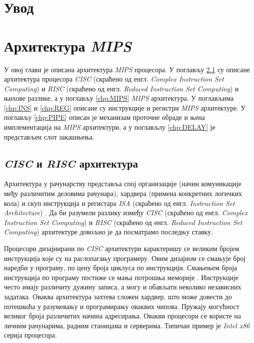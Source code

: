 \documentclass[12pt,oneside]{memoir}
\begin{document}
\frontmatter

\naslovna

\komisija

\posveta{}

\apstrakt

\tableofcontents*

\mainmatter

\chapter{Увод}

\chapter{Архитектура \textit{MIPS}}

У овој глави је описана архитектура \textit{MIPS} процесора. У поглављу \ref{chp:CR} су описане архитектура
процесора \textit{CISC} (скраћено од енгл. \textit{Complex Instruction Set Computing}) и \textit{RISC} (скраћено од
енгл. \textit{Reduced Instruction Set Computing}) и њихове разлике, а у поглављу \ref{chp:MIPS} \textit{MIPS}
архитектура. У поглављима \ref{chp:INS} и \ref{chp:REG} описане су инструкције и регистри \textit{MIPS} архитектуре.
У поглављу \ref{chp:PIPE} описан је механизам проточне обраде и њена имплементација на \textit{MIPS} архитектури, а у поглављлу \ref{chp:DELAY} је представљен слот закашњења.

\section{\textit{CISC} и \textit{RISC} архитектура} \label{chp:CR}

Архитектура у рачунарству представља спој организације (начин комуникације међу различитим деловима рачунара),
хардвера (примена конкретних логичких кола) и скуп инструкција и регистара \textit{ISA} (скраћено од енгл.
\textit{Instruction Set Architecture}) \cite{ARCH}. Да би разумели разлику између \textit{CISC} (скраћено од енгл.
\textit{Complex Instruction Set Computing}) и \textit{RISC} (скраћено од енгл. \textit{Reduced Instruction Set
Computing}) архитектуре довољно је да посматрамо последњу ставку.

Процесори дизајнирани по \textit{CISC} архитектури карактеришу се великим бројем инструкција које су на раслопагању
програмеру. Овим дизајном се смањује број наредби у програму, по цену броја циклуса по инструкцији. Смањењем броја
инструкција по програму постиже се мања потрошња меморије \cite{CR}. Инструкције често имају различиту дужину
записа, а могу и обављати неколико независних задатака. Оваква архитектура захтева сложен хардвер, што може довести
до потешкоћа у разумевању и програмирању оваквих чипова. Пружају могућност великог броја различитих начина
адресирања. Овакви процесори се користе на личним рачунарима, радним станицама и серверима. Типичан пример је
\textit{Intel x86} серија процесора.
\end{document}
